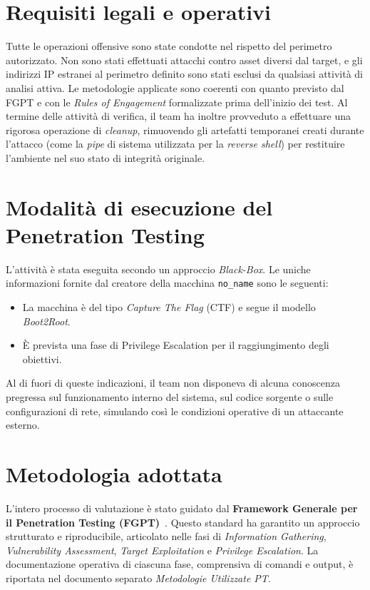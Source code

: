 \documentclass[11pt]{report}
\begin{document}
	\section{Requisiti legali e operativi}
	Tutte le operazioni offensive sono state condotte nel rispetto del perimetro autorizzato. Non sono stati effettuati attacchi contro asset diversi dal target, e gli indirizzi IP estranei al perimetro definito sono stati esclusi da qualsiasi attività di analisi attiva. Le metodologie applicate sono coerenti con quanto previsto dal FGPT e con le \textit{Rules of Engagement} formalizzate prima dell'inizio dei test. Al termine delle attività di verifica, il team ha inoltre provveduto a effettuare una rigorosa operazione di \textit{cleanup}, rimuovendo gli artefatti temporanei creati durante l'attacco (come la \textit{pipe} di sistema utilizzata per la \textit{reverse shell}) per restituire l'ambiente nel suo stato di integrità originale.
	
	\section{Modalità di esecuzione del Penetration Testing}
	L'attività è stata eseguita secondo un approccio \textit{Black-Box}. Le uniche informazioni fornite dal creatore della macchina \texttt{no\_name} sono le seguenti:
	\begin{itemize}
		\item La macchina è del tipo \textit{Capture The Flag} (CTF) e segue il modello \textit{Boot2Root}.
		\item È prevista una fase di Privilege Escalation per il raggiungimento degli obiettivi.
	\end{itemize}
	Al di fuori di queste indicazioni, il team non disponeva di alcuna conoscenza pregressa sul funzionamento interno del sistema, sul codice sorgente o sulle configurazioni di rete, simulando così le condizioni operative di un attaccante esterno.
	
	\section{Metodologia adottata}
	L'intero processo di valutazione è stato guidato dal \textbf{Framework Generale per il Penetration Testing (FGPT)}~\cite{ptes}. Questo standard ha garantito un approccio strutturato e riproducibile, articolato nelle fasi di \textit{Information Gathering}, \textit{Vulnerability Assessment}, \textit{Target Exploitation} e \textit{Privilege Escalation}. La documentazione operativa di ciascuna fase, comprensiva di comandi e output, è riportata nel documento separato \textit{Metodologie Utilizzate PT}.
	
\end{document}
